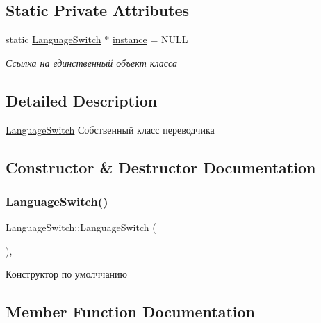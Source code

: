 \subsection*{Static Private Attributes}
\begin{DoxyCompactItemize}
\item 
\mbox{\label{class_language_switch_a761e2df31d785a582264c8d51d46e14f}} 
static \mbox{\hyperlink{class_language_switch}{Language\+Switch}} $\ast$ \mbox{\hyperlink{class_language_switch_a761e2df31d785a582264c8d51d46e14f}{instance}} = N\+U\+LL
\begin{DoxyCompactList}\small\item\em Ссылка на единственный объект класса \end{DoxyCompactList}\end{DoxyCompactItemize}


\subsection{Detailed Description}
\mbox{\hyperlink{class_language_switch}{Language\+Switch}} Собственный класс переводчика 

\subsection{Constructor \& Destructor Documentation}
\mbox{\label{class_language_switch_aaaf776c062ae2690092a674e7e5efdd1}} 
\subsubsection{\texorpdfstring{LanguageSwitch()}{LanguageSwitch()}}
{\footnotesize\ttfamily Language\+Switch\+::\+Language\+Switch (\begin{DoxyParamCaption}{ }\end{DoxyParamCaption})\hspace{0.3cm}{\ttfamily [inline]}, {\ttfamily [protected]}}

Конструктор по умолччанию 

\subsection{Member Function Documentation}
\mbox{\label{class_language_switch_ab97b59217547f4ac359b80132a41002b}} 
